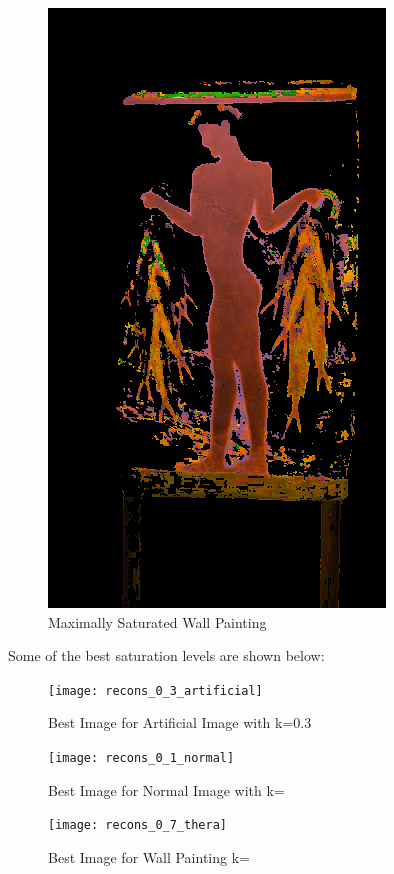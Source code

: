 \documentclass[]{article}
\begin{document}
\begin{figure}[h!]
  \begin{center}
    \includegraphics[scale=0.4]{recons_100_thera}
    \caption[p3]{Maximally Saturated Wall Painting}
  \end{center}
\end{figure}

Some of the best saturation levels are shown below:
\begin{figure}[h!]
  \begin{center}
    \texttt{[image: recons\_0\_3\_artificial]}
    \caption[p3]{Best Image for Artificial Image with k=0.3}
  \end{center}
\end{figure}
\begin{figure}[h!]
  \begin{center}
    \texttt{[image: recons\_0\_1\_normal]}
    \caption[p3]{Best Image for Normal Image with k=}
  \end{center}
\end{figure}
\begin{figure}[h!]
  \begin{center}
    \texttt{[image: recons\_0\_7\_thera]}
    \caption[p3]{Best Image for Wall Painting k=}
  \end{center}
\end{figure}
\end{document}
